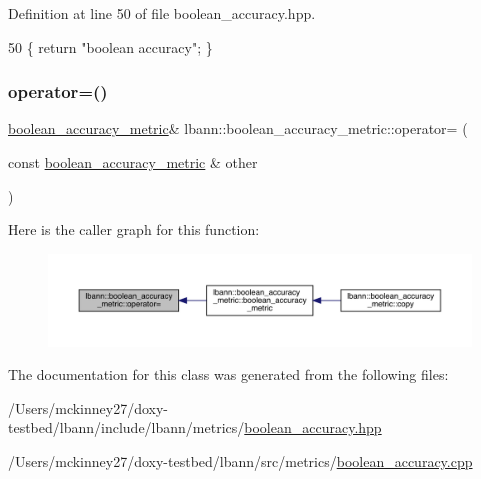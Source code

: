 Definition at line 50 of file boolean\+\_\+accuracy.\+hpp.


\begin{DoxyCode}
50 \{ \textcolor{keywordflow}{return} \textcolor{stringliteral}{"boolean accuracy"}; \}
\end{DoxyCode}
\mbox{\label{classlbann_1_1boolean__accuracy__metric_afb79aa75d193aaa090ce81352a5690e6}} 
\subsubsection{\texorpdfstring{operator=()}{operator=()}}
{\footnotesize\ttfamily \hyperlink{classlbann_1_1boolean__accuracy__metric}{boolean\+\_\+accuracy\+\_\+metric}\& lbann\+::boolean\+\_\+accuracy\+\_\+metric\+::operator= (\begin{DoxyParamCaption}\item[{const \hyperlink{classlbann_1_1boolean__accuracy__metric}{boolean\+\_\+accuracy\+\_\+metric} \&}]{other }\end{DoxyParamCaption})\hspace{0.3cm}{\ttfamily [default]}}

Here is the caller graph for this function\+:\nopagebreak
\begin{figure}[H]
\begin{center}
\leavevmode
\includegraphics[width=350pt]{classlbann_1_1boolean__accuracy__metric_afb79aa75d193aaa090ce81352a5690e6_icgraph}
\end{center}
\end{figure}


The documentation for this class was generated from the following files\+:\begin{DoxyCompactItemize}
\item 
/\+Users/mckinney27/doxy-\/testbed/lbann/include/lbann/metrics/\hyperlink{boolean__accuracy_8hpp}{boolean\+\_\+accuracy.\+hpp}\item 
/\+Users/mckinney27/doxy-\/testbed/lbann/src/metrics/\hyperlink{boolean__accuracy_8cpp}{boolean\+\_\+accuracy.\+cpp}\end{DoxyCompactItemize}
